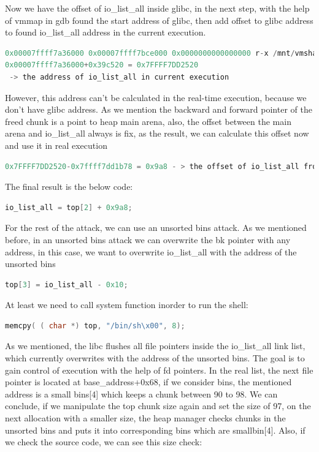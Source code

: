 \documentclass{masterthesis}
\newcommand*\libc{glibc}
\newcommand*\ub{unsorted bins}
\newcommand*\sbs{small bins}
\begin{document}
Now we have the offset of io\_list\_all inside \libc{}, in the next step, with the help of vmmap in gdb found the start address of \libc{}, then add offset to \libc{} address to found io\_list\_all address in the current execution.
\begin{lstlisting}[language=c,frame=tlrb]
0x00007ffff7a36000 0x00007ffff7bce000 0x0000000000000000 r-x /mnt/vmshare/MasterThesis/libc223/libc.so.6
0x00007ffff7a36000+0x39c520 = 0x7FFFF7DD2520
 -> the address of io_list_all in current execution
\end{lstlisting}



However, this address can’t be calculated in the real-time execution, because we don’t have \libc{} address. As we mention the backward and forward pointer of the freed chunk is a point to heap main arena, also, the offset between the main arena and io\_list\_all always is fix, as the result, we can calculate this offset now and use it in real execution 
\begin{lstlisting}[language=c,frame=tlrb]
0x7FFFF7DD2520-0x7ffff7dd1b78 = 0x9a8 - > the offset of io_list_all from main arena
\end{lstlisting}

The final result is the below code:

\begin{lstlisting}[language=c,frame=tlrb]
io_list_all = top[2] + 0x9a8;
\end{lstlisting}

For the rest of the attack, we can use an \ub{} attack. As we mentioned before, in an \ub{} attack we can overwrite the bk pointer with any address, in this case, we want to overwrite io\_list\_all with the address of the \ub{} 

\begin{lstlisting}[language=c,frame=tlrb]
top[3] = io_list_all - 0x10;
\end{lstlisting}

At least we need to call system function inorder to run the shell:

\begin{lstlisting}[language=c,frame=tlrb]
memcpy( ( char *) top, "/bin/sh\x00", 8);
\end{lstlisting}


As we mentioned, the libc flushes all file pointers inside the io\_list\_all link list, which currently overwrites with the address of the \ub{}. 
The goal is to gain control of execution with the help of fd pointers. In the real list, the next file pointer is located at base\_address+0x68, if we consider bins, the mentioned address is a \sbs{}[4] which keeps a chunk between 90 to 98. We can conclude, if we manipulate the top chunk size again and set the size of 97, on the next allocation with a smaller size, the heap manager checks chunks in the \ub{} and puts it into corresponding bins which are smallbin[4]. Also, if we check the source code, we can see this size check: 
\end{document}
